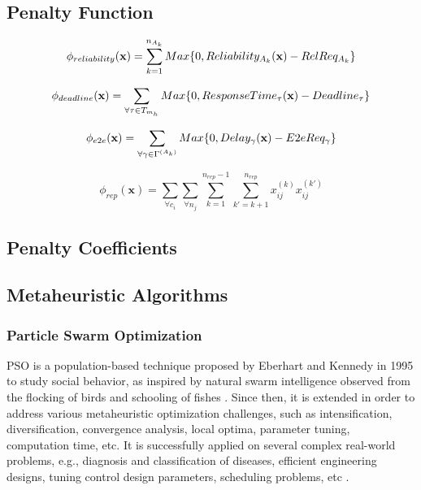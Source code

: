 \subsection{Penalty Function}
\label{sec:penaltyfunction}

\begin{equation}
\label{}
    \phi_{reliability}(\textbf{x}) = \sum_{k=1}^{n_{A_k}}{Max \{0, Reliability_{A_k}(\textbf{x}) - RelReq_{A_k} \}}
\end{equation}

\begin{equation}
\label{}
    \phi_{deadline}(\textbf{x}) = \sum_{\forall \tau\in T_{m_h}}{Max \{0, ResponseTime_{\tau}(\textbf{x}) - Deadline_{\tau} \}}
\end{equation}

\begin{equation}
\label{}
    \phi_{e2e}(\textbf{x}) = \sum_{\forall \gamma \in \ssp{\Gamma}}{Max \{0, Delay_\gamma(\x) - E2eReq_\gamma \}}
\end{equation}

\begin{equation}
\label{}
    \phi_{rep}(\textbf{x}) = \sum_{\forall c_i}{\sum_{\forall n_j}{\sum_{k=1}^{n_{rep}-1}{\sum_{k'=k+1}^{n_{rep}} x_{ij}^{(k)} x_{ij}^{(k')}}}}
\end{equation}



\subsection{Penalty Coefficients}
\label{sec:penaltycoefficient}

\subsection{Metaheuristic Algorithms}
\subsubsection{Particle Swarm Optimization}
PSO is a population-based technique proposed by Eberhart and Kennedy in 1995 to study social behavior, as inspired by natural swarm intelligence observed from the flocking of birds and schooling of fishes \cite{Kennedy1995ParticleOptimization}. Since then, it is extended in order to address various metaheuristic optimization challenges, such as intensification, diversification, convergence analysis, local optima, parameter tuning, computation time, etc. It is successfully applied on several complex real-world problems, e.g., diagnosis and classification of diseases, efficient engineering designs, tuning control design parameters, scheduling problems, etc \cite{Poli2008AnApplications}. 

